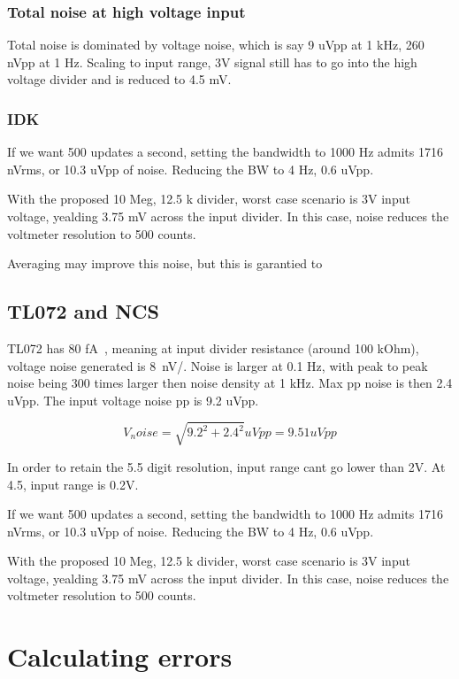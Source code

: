 \documentclass[11pt]{article}
\begin{document}
\subsubsection{Total noise at high voltage input}
Total noise is dominated by voltage noise, which is say 9 uVpp at 1 kHz, 
260 nVpp at 1 Hz. Scaling to input range, 3V signal still has to go into the 
high voltage divider and is reduced to 4.5 mV. 

\subsubsection{IDK}
If we want 500 updates a second, setting the bandwidth to 1000 Hz admits 
1716 nVrms, or 10.3 uVpp of noise.
Reducing the BW to 4 Hz, 0.6 uVpp.

With the proposed 10 Meg, 12.5 k divider, worst case scenario is 3V input voltage,
yealding 3.75 mV across the input divider. In this case, noise reduces the 
voltmeter resolution to 500 counts.


Averaging may improve this noise, but this is garantied to 


\subsection{TL072 and NCS}
TL072 has 80 \si{\femto \ampere \sqrt{\hertz}}, meaning at input divider
resistance (around 100 kOhm), voltage noise generated is \si{8 nV/}. 
Noise is larger at 0.1 Hz, with peak to peak noise being 300 times larger then
noise density at 1 kHz. Max pp noise is then 2.4 uVpp. 
The input voltage noise pp is 9.2 uVpp.

\begin{equation}
  V_noise = \sqrt{ 9.2^2 + 2.4^2} uVpp = 9.51 uVpp
  \label{eq:NCS218xx input noise}
\end{equation}

In order to retain the 5.5 digit resolution, input range cant go lower than 2V.
At 4.5, input range is 0.2V.

If we want 500 updates a second, setting the bandwidth to 1000 Hz admits 
1716 nVrms, or 10.3 uVpp of noise.
Reducing the BW to 4 Hz, 0.6 uVpp.

With the proposed 10 Meg, 12.5 k divider, worst case scenario is 3V input voltage,
yealding 3.75 mV across the input divider. In this case, noise reduces the 
voltmeter resolution to 500 counts.

\pagebreak
\section{Calculating errors}
\end{document}
